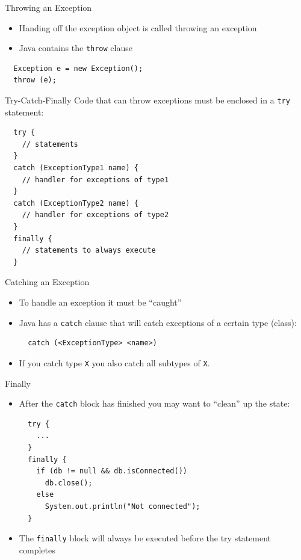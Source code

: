 \begin{frame}[fragile]{Throwing an Exception}
  \begin{itemize}
  \item Handing off the exception object is called throwing an
    exception
  \item Java contains the \lstinline!throw! clause
  \end{itemize}


  \begin{lstlisting}
  Exception e = new Exception();
  throw (e);
  \end{lstlisting}
\end{frame}

\begin{frame}[fragile]{Try-Catch-Finally}
  Code that can throw exceptions must be enclosed in a \lstinline!try! 
  statement:
  \begin{lstlisting}
  try {
    // statements
  } 
  catch (ExceptionType1 name) {
    // handler for exceptions of type1
  } 
  catch (ExceptionType2 name) {
    // handler for exceptions of type2
  } 
  finally {
    // statements to always execute
  }
  \end{lstlisting}
\end{frame}

\begin{frame}[fragile]{Catching an Exception}
  \begin{itemize}
  \item To handle an exception it must be ``caught''
  \item Java has a \lstinline!catch! clause that will catch exceptions
    of a certain type (class):
    \begin{lstlisting}
  catch (<ExceptionType> <name>)
    \end{lstlisting}
  \item If you catch type \lstinline!X! you also catch all subtypes of
    \lstinline!X!.
  \end{itemize}
\end{frame}

\begin{frame}[fragile]{Finally}
  \begin{itemize}
  \item After the \lstinline!catch! block has finished you may want to
    ``clean'' up the state:
   \begin{lstlisting}
  try {
    ...
  } 
  finally {
    if (db != null && db.isConnected())
      db.close();
    else
      System.out.println("Not connected");
  }     
   \end{lstlisting}
 \item The \lstinline!finally! block will always be executed before
   the try statement completes
  \end{itemize}
\end{frame}

